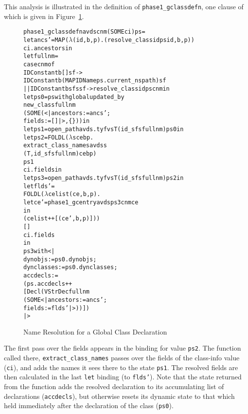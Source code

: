 \documentclass[11pt]{article}
\newcommand{\lbr}{\texttt{\{}}
\newcommand{\rbr}{\texttt{\}}}
\begin{document}
This analysis is illustrated in the definition of
\texttt{phase1_gclassdefn}, one clause of which is given in
Figure~\ref{fig:phase1-gclassdefn}.
\begin{figure}[htbp]
\begin{alltt}
   phase1_gclassdefn avds cnm (SOME ci) ps =
     let ancs' = MAP (\(\lambda\)(id,b,p). (resolve_classid ps id, b, p))
                     ci.ancestors in
     let fullnm =
           case cnm of
              IDConstant b [] sf ->
                 IDConstant b (MAP IDName ps.current_nspath) sf
           || IDConstant b sfs sf -> resolve_classid ps cnm in
     let ps0 = ps with global updated_by
                 new_class fullnm
                           (SOME (<| ancestors := ancs' ;
                                     fields := [] |>, \lbr\rbr)) in
     let ps1 = open_path avds.tyfvs T (id_sfs fullnm) ps0 in
     let ps2 = FOLDL (\(\lambda\)s cebp.
                        extract_class_names avds s
                           (T, id_sfs fullnm) cebp)
                     ps1
                     ci.fields in
     let ps3 = open_path avds.tyfvs T (id_sfs fullnm) ps2 in
     let flds' =
         FOLDL (\(\lambda\)celist (ce,b,p).
                  let ce' = phase1_gcentry avds ps3 cnm ce
                  in
                    (celist ++ [(ce',b,p)]))
               []
               ci.fields
     in
       ps3 with <|
         dynobjs := ps0.dynobjs ;
         dynclasses := ps0.dynclasses ;
         accdecls :=
           (ps.accdecls ++
            [Decl (VStrDec fullnm
                     (SOME <| ancestors := ancs' ;
                              fields := flds' |>))])
       |>
\end{alltt}
\caption{Name Resolution for a Global Class Declaration}
\label{fig:phase1-gclassdefn}
\end{figure}
The first pass over the fields appears in the binding for value
\texttt{ps2}.  The function called there, \texttt{extract_class_names}
passes over the fields of the class-info value (\texttt{ci}), and adds
the names it sees there to the state \texttt{ps1}.  The resolved
fields are then calculated in the last \texttt{let} binding (to
\texttt{flds'}).  Note that the state returned from the function adds
the resolved declaration to its accumulating list of declarations
(\texttt{accdecls}), but otherwise resets its dynamic state to that
which held immediately after the declaration of the class
(\texttt{ps0}).
\end{document}
